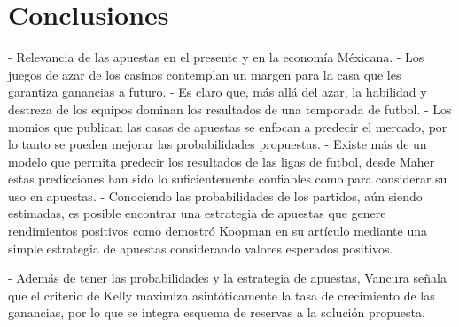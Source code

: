 %
\chapter{Conclusiones}

- Relevancia de las apuestas en el presente y en la economía Méxicana.
- Los juegos de azar de los casinos contemplan un margen para la casa que les garantiza ganancias a futuro.
- Es claro que, más allá del azar, la habilidad y destreza de los equipos dominan los resultados de una temporada de futbol.
- Los momios que publican las casas de apuestas se enfocan a predecir el mercado, por lo tanto se pueden mejorar las probabilidades propuestas.
- Existe más de un modelo que permita predecir los resultados de las ligas de futbol, desde Maher \cite{maher1982modelling} estas predicciones han sido lo suficientemente confiables como para considerar su uso en apuestas.
- Conociendo las probabilidades de los partidos, aún siendo estimadas, es posible encontrar una estrategia de apuestas que genere rendimientos positivos como demostró Koopman en su artículo \cite{koopman2013dynamic} mediante una simple estrategia de apuestas considerando valores esperados positivos.


- Además de tener las probabilidades y la estrategia de apuestas, Vancura \cite{vancura2000finding} señala que el criterio de Kelly \cite{kelly1956new} maximiza asintóticamente la tasa de crecimiento de las ganancias, por lo que se integra esquema de reservas a la solución propuesta.

